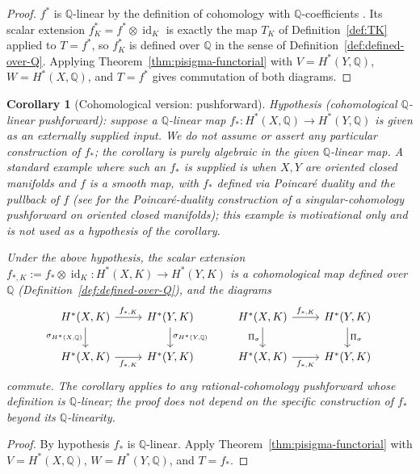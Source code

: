 \documentclass[11pt, a4paper]{amsart}
\newtheorem{corollary}[theorem]{Corollary}
\theoremstyle{definition}
\newcommand{\Q}{\mathbb{Q}}
\newcommand{\id}{\operatorname{id}}
\begin{document}
\begin{proof}
$f^*$ is $\Q$-linear by the definition of cohomology with
$\Q$-coefficients \cite[Ch.~3]{Hatcher}. Its scalar extension
$f^*_K = f^* \otimes \id_K$ is exactly the map $T_K$ of
Definition~\ref{def:TK} applied to $T = f^*$, so
$f^*_K$ is defined over $\Q$ in the sense of
Definition~\ref{def:defined-over-Q}. Applying
Theorem~\ref{thm:pisigma-functorial} with $V = H^*(Y, \Q)$, $W =
H^*(X, \Q)$, and $T = f^*$ gives commutation of both diagrams.
\end{proof}

\begin{corollary}[Cohomological version: pushforward]
\label{cor:cohomological-pushforward}
\emph{Hypothesis} (cohomological $\Q$-linear pushforward): suppose
a $\Q$-linear map
$f_* \colon H^*(X, \Q) \to H^*(Y, \Q)$ is given as an externally
supplied input. We do not assume or assert any particular
construction of $f_*$; the corollary is purely algebraic in the
given $\Q$-linear map. A standard example where such an $f_*$ is
supplied is when $X, Y$ are oriented closed manifolds and $f$ is a
smooth map, with $f_*$ defined via Poincar\'e duality and the
pullback of $f$ (see \cite[Ch.~3]{Hatcher} for the Poincar\'e-duality
construction of a singular-cohomology pushforward on oriented closed
manifolds); this example is motivational only and is not used as a
hypothesis of the corollary.

Under the above hypothesis, the scalar extension
$f_{*,K} := f_* \otimes \id_K \colon H^*(X, K) \to
H^*(Y, K)$ is a cohomological map defined over $\Q$
(Definition~\ref{def:defined-over-Q}), and the diagrams
\[
\begin{tikzcd}
  H^*(X, K) \arrow[r, "f_{*,K}"] \arrow[d, "\sigma_{H^*(X, \Q)}"'] & H^*(Y, K) \arrow[d, "\sigma_{H^*(Y, \Q)}"] \\
  H^*(X, K) \arrow[r, "f_{*,K}"'] & H^*(Y, K)
\end{tikzcd}
\qquad
\begin{tikzcd}
  H^*(X, K) \arrow[r, "f_{*,K}"] \arrow[d, "\Pi_\sigma"'] & H^*(Y, K) \arrow[d, "\Pi_\sigma"] \\
  H^*(X, K) \arrow[r, "f_{*,K}"'] & H^*(Y, K)
\end{tikzcd}
\]
commute. The corollary applies to any rational-cohomology
pushforward whose definition is $\Q$-linear; the proof does not
depend on the specific construction of $f_*$ beyond its
$\Q$-linearity.
\end{corollary}

\begin{proof}
By hypothesis $f_*$ is $\Q$-linear. Apply
Theorem~\ref{thm:pisigma-functorial} with $V = H^*(X, \Q)$, $W =
H^*(Y, \Q)$, and $T = f_*$.
\end{proof}
\end{document}
